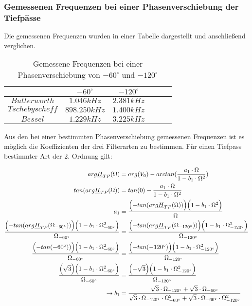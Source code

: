 \newpage

\subsubsection{Gemessenen Frequenzen bei einer Phasenverschiebung der Tiefpässe}
\noindent Die gemessenen Frequenzen wurden in einer Tabelle dargestellt und anschließend verglichen.

		\begin{table}[h]
			\centering
			\begin{tabular}{c|c|c|c|c|c}
				$ $             & $-60^\circ $ & $-120^\circ$  \\
				\hline		
				$Butterworth$   & $1.046kHz$   & $2.381kHz$    \\
				\hline
				$Tschebyscheff$ & $898.250kHz$ & $1.400kHz$    \\ 
				\hline
				$Bessel$        & $1.229kHz$   & $3.225kHz$    \\
			\end{tabular}
			\caption{Gemessene Frequenzen bei einer Phasenverschiebung von $-60^\circ$ und $-120^\circ$ }
			\label{tab:phasenverschiebung_hp_tp_vorausberechnung}
		\end{table}
		
\noindent Aus den bei einer bestimmten Phasenverschiebung gemessenen Frequenzen ist es möglich die Koeffizienten der drei Filterarten zu bestimmen. 
\noindent Für einen Tiefpass bestimmter Art der 2. Ordnung gilt:

\small{
\begin{alignat*}{2}
arg\underline{H}_{TP}(\Omega) &= arg(V_0) - arctan(\frac{a_1 \cdot \Omega}{1-b_1\cdot \Omega^2}) \\
tan(arg\underline{H}_{TP}(\Omega)) &= tan(0) - \frac{a_1 \cdot \Omega}{1-b_1\cdot \Omega^2}\\
a_1 &= \frac{\Bigl(- tan(arg\underline{H}_{TP}(\Omega))\Bigr)\Bigl(1-b_1 \cdot \Omega^2\Bigr)}{\Omega}\\
\frac{\Bigl(- tan(arg\underline{H}_{TP}(\Omega_{-60^\circ}))\Bigr)\Bigl(1-b_1 \cdot \Omega_{-60^\circ}^2\Bigr)}{\Omega_{-60^\circ}} &= \frac{\Bigl(- tan(arg\underline{H}_{TP}(\Omega_{-120^\circ}))\Bigr)\Bigl(1-b_1 \cdot \Omega_{-120^\circ}^2\Bigr)}{\Omega_{-120^\circ}}\\
\frac{\Bigl(- tan(-60^\circ))\Bigr)\Bigl(1-b_1 \cdot \Omega_{-60^\circ}^2\Bigr)}{\Omega_{-60^\circ}} &= \frac{\Bigl(- tan(-120^\circ)\Bigr)\Bigl(1-b_1 \cdot \Omega_{-120^\circ}^2\Bigr)}{\Omega_{-120^\circ}}\\
\frac{\Bigl( \sqrt{3} \Bigr)\Bigl(1-b_1 \cdot \Omega_{-60^\circ}^2\Bigr)}{\Omega_{-60^\circ}} &= \frac{\Bigl(-\sqrt{3}\Bigr)\Bigl(1-b_1 \cdot \Omega_{-120^\circ}^2\Bigr)}{\Omega_{-120^\circ}}\\
\rightarrow b_1 &= \frac{\sqrt{3}\cdot \Omega_{-120^\circ}+\sqrt{3}\cdot \Omega_{-60^\circ}}
{\sqrt{3}\cdot \Omega_{-120^\circ}\cdot \Omega_{-60^\circ}^2 +\sqrt{3}\cdot \Omega_{-60^\circ}\cdot \Omega_{-120^\circ}^2}
\end{alignat*}}

